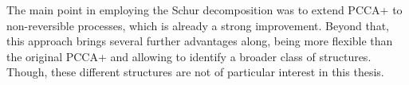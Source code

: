 
The main point in employing the Schur decomposition was to extend PCCA+ to non-reversible processes, which is already a strong improvement.
Beyond that, this approach brings several further advantages along, being more flexible than the original PCCA+ and allowing to identify a broader class of structures.
Though, these different structures are not of particular interest in this thesis. %